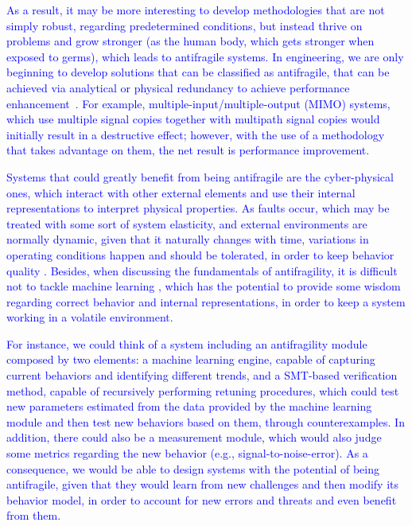 \documentclass{cta-author}
\begin{document}
{{		\textcolor{blue}{As a result, it may be more interesting to develop methodologies that are not simply robust, regarding predetermined conditions, but instead thrive on problems and grow stronger (as the human body, which gets stronger when exposed to germs), which leads to antifragile systems. In engineering, we are only beginning to develop solutions that can be classified as antifragile, that can be achieved via analytical or physical redundancy to achieve performance enhancement~\cite{spectrum2013}. For example, multiple-input/multiple-output (MIMO) systems, which use multiple signal copies together with multipath signal copies would initially result in a destructive effect; however, with the use of a methodology that takes advantage on them, the net result is performance improvement.}
		
		\textcolor{blue}{Systems that could greatly benefit from being antifragile are the cyber-physical ones, which interact with other external elements and use their internal representations to interpret physical properties. As faults occur, which may be treated with some sort of system elasticity, and external environments are normally dynamic, given that it naturally changes with time, variations in operating conditions happen and should be tolerated, in order to keep behavior quality \cite{antifragile}. Besides, when discussing the fundamentals of antifragility, it is difficult not to tackle machine learning \cite{antifragile}, which has the potential to provide some wisdom regarding correct behavior and internal representations, in order to keep a system working in a volatile environment.}
		
		\textcolor{blue}{For instance, we could think of a system including an antifragility module composed by two elements: a machine learning engine, capable of capturing current behaviors and identifying different trends, and a SMT-based verification method, capable of recursively performing retuning procedures, which could test new parameters estimated from the data provided by the machine learning module and then test new behaviors based on them, through counterexamples. In addition, there could also be a measurement module, which would also judge some metrics regarding the new behavior ({e.g.}, signal-to-noise-error). As a consequence, we would be able to design systems with the potential of being antifragile, given that they would learn from new challenges and then modify its behavior model, in order to account for new errors and threats and even benefit from them.}
		
}}
\end{document}
